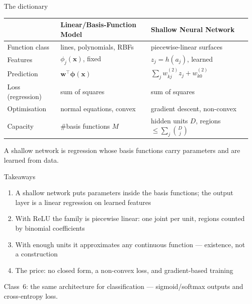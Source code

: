 \documentclass[aspectratio=169, 11pt]{beamer}
\newcommand{\nosrc}{}       %
\begin{document}
\begin{frame}{The dictionary}
  \nosrc
  \centering
  \renewcommand{\arraystretch}{1.12}
  {\footnotesize
  \begin{tabular}{p{} p{}
                  p{}}
    & \textbf{\color{mlc}Linear/Basis-Function Model}
    & \textbf{\color{nnc}Shallow Neural Network}\\
    \hline
    Function class
      & lines, polynomials, RBFs
      & piecewise-linear surfaces\\
    Features
      & $\phi_j(\mathbf{x})$, fixed
      & $z_j=h(a_j)$, learned\\
    Prediction
      & $\mathbf{w}^{\!\top}\boldsymbol{\phi}(\mathbf{x})$
      & $\sum_j w_{kj}^{(2)} z_j + w_{k0}^{(2)}$\\
    Loss (regression)
      & sum of squares
      & sum of squares\\
    Optimisation
      & normal equations, convex
      & gradient descent, non-convex\\
    Capacity
      & \#basis functions $M$
      & hidden units $D$, regions
        $\le\sum_j\binom{D}{j}$\\
    \hline
  \end{tabular}}
  \vspace{0.5em}
  \begin{redhighlight}
    A shallow network is regression whose basis functions
    carry parameters and are learned from data.
  \end{redhighlight}
\end{frame}

\begin{frame}{Takeaways}
  \nosrc
  \begin{enumerate}
    \item A shallow network puts parameters inside the
          basis functions; the output layer is a
          \alert{linear regression on learned features}
    \item With ReLU the family is \alert{piecewise
          linear}: one joint per unit, regions counted by
          binomial coefficients
    \item With enough units it approximates \alert{any
          continuous function} --- existence, not a
          construction
    \item The price: \alert{no closed form}, a non-convex
          loss, and gradient-based training
  \end{enumerate}
  \vspace{0.4em}
  \begin{redhighlight}
    Class~6: the same architecture for
    \alert{classification} --- sigmoid/softmax outputs and
    cross-entropy loss.
  \end{redhighlight}
\end{frame}
\end{document}
